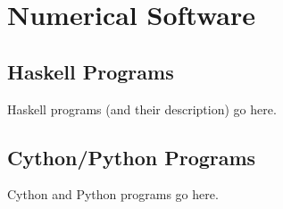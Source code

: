 \chapter{Numerical Software}
\label{cha:numerical_software}

\minitoc
\vspace{10mm}

\section{Haskell Programs}
Haskell programs (and their description) go here.

\section{Cython/Python Programs}
Cython and Python programs go here.
